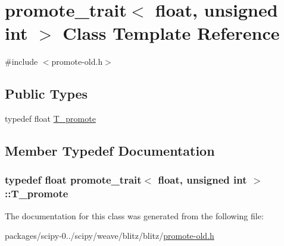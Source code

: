 \hypertarget{classpromote__trait_3_01float_00_01unsigned_01int_01_4}{}\section{promote\+\_\+trait$<$ float, unsigned int $>$ Class Template Reference}
\label{classpromote__trait_3_01float_00_01unsigned_01int_01_4}


{\ttfamily \#include $<$promote-\/old.\+h$>$}

\subsection*{Public Types}
\begin{DoxyCompactItemize}
\item 
typedef float \hyperlink{classpromote__trait_3_01float_00_01unsigned_01int_01_4_a7a8ea57c96356ed7be8da100ad227785}{T\+\_\+promote}
\end{DoxyCompactItemize}


\subsection{Member Typedef Documentation}
\hypertarget{classpromote__trait_3_01float_00_01unsigned_01int_01_4_a7a8ea57c96356ed7be8da100ad227785}{}
\subsubsection[{T\+\_\+promote}]{\setlength{\rightskip}{0pt plus 5cm}typedef float {\bf promote\+\_\+trait}$<$ float, unsigned int $>$\+::{\bf T\+\_\+promote}}\label{classpromote__trait_3_01float_00_01unsigned_01int_01_4_a7a8ea57c96356ed7be8da100ad227785}


The documentation for this class was generated from the following file\+:\begin{DoxyCompactItemize}
\item 
packages/scipy-\/0../scipy/weave/blitz/blitz/\hyperlink{promote-old_8h}{promote-\/old.\+h}\end{DoxyCompactItemize}
